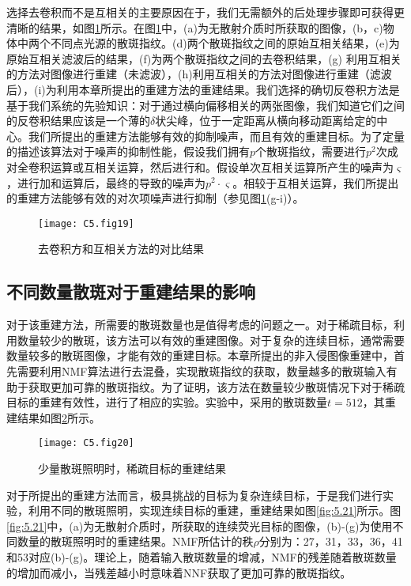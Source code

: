 选择去卷积而不是互相关的主要原因在于，我们无需额外的后处理步骤即可获得更清晰的结果，如图\ref{fig:5.19}所示。在图\ref{fig:5.19}中，(a)为无散射介质时所获取的图像，(b，c)物体中两个不同点光源的散斑指纹。(d)两个散斑指纹之间的原始互相关结果，(e)为原始互相关滤波后的结果，(f)为两个散斑指纹之间的去卷积结果，(g) 利用互相关的方法对图像进行重建（未滤波），(h)利用互相关的方法对图像进行重建（滤波后），(i)为利用本章所提出的重建方法的重建结果。我们选择的确切反卷积方法是基于我们系统的先验知识：对于通过横向偏移相关的两张图像，我们知道它们之间的反卷积结果应该是一个薄的$\delta$状尖峰，位于一定距离从横向移动距离给定的中心。我们所提出的重建方法能够有效的抑制噪声，而且有效的重建目标。为了定量的描述该算法对于噪声的抑制性能，假设我们拥有$p$个散斑指纹，需要进行$p^2$次成对全卷积运算或互相关运算，然后进行和。假设单次互相关运算所产生的噪声为$\varsigma$，进行加和运算后，最终的导致的噪声为$p^2 \cdot \varsigma$。相较于互相关运算，我们所提出的重建方法能够有效的对次项噪声进行抑制（参见图\ref{fig:5.19}(g-i)）。

\begin{figure}[htp]
	\centering
	\texttt{[image: C5.fig19]}
	\caption{去卷积方和互相关方法的对比结果}
	\label{fig:5.19}
\end{figure}

\subsection{不同数量散斑对于重建结果的影响}

对于该重建方法，所需要的散斑数量也是值得考虑的问题之一。对于稀疏目标，利用数量较少的散斑，该方法可以有效的重建图像。对于复杂的连续目标，通常需要数量较多的散斑图像，才能有效的重建目标。本章所提出的非入侵图像重建中，首先需要利用NMF算法进行去混叠，实现散斑指纹的获取，数量越多的散斑输入有助于获取更加可靠的散斑指纹。为了证明，该方法在数量较少散斑情况下对于稀疏目标的重建有效性，进行了相应的实验。实验中，采用的散斑数量$t = 512$，其重建结果如图\ref{fig:5.20}所示。

\begin{figure}[htp]
	\centering
	\texttt{[image: C5.fig20]}
	\caption{少量散斑照明时，稀疏目标的重建结果}
	\label{fig:5.20}
\end{figure}

对于所提出的重建方法而言，极具挑战的目标为复杂连续目标，于是我们进行实验，利用不同的散斑照明，实现连续目标的重建，重建结果如图\ref{fig:5.21}所示。图\ref{fig:5.21}中，(a)为无散射介质时，所获取的连续荧光目标的图像，(b)-(g)为使用不同数量的散斑照明时的重建结果。NMF所估计的秩$\rho$分别为：27，31，33，36，41和53对应(b)-(g)。理论上，随着输入散斑数量的增减，NMF的残差随着散斑数量的增加而减小，当残差越小时意味着NNF获取了更加可靠的散斑指纹。

